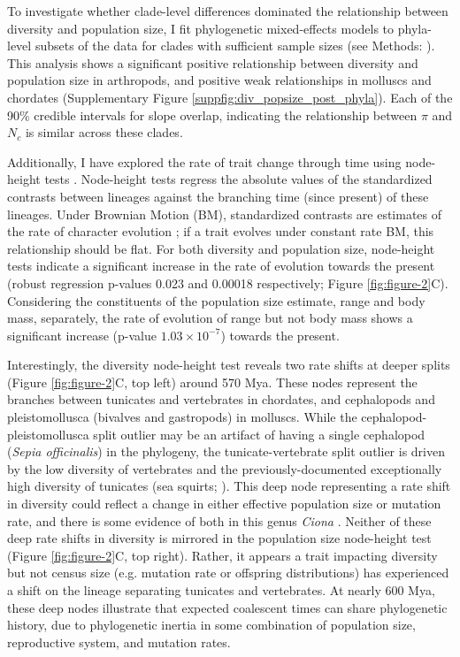 \documentclass[11pt]{article}
\newcommand{\Newnameref}[1]{\textit{\nameref{#1}}}
\begin{document}
To investigate whether clade-level differences dominated the relationship
between diversity and population size, I fit phylogenetic mixed-effects models
to phyla-level subsets of the data for clades with sufficient sample sizes (see
Methods: \Newnameref{sec:methods-pcm}). This analysis shows a significant
positive relationship between diversity and population size in arthropods, and
positive weak relationships in molluscs and chordates (Supplementary Figure
\ref{suppfig:div_popsize_post_phyla}). Each of the 90\% credible intervals for
slope overlap, indicating the relationship between $\pi$ and $N_c$ is similar
across these clades.

Additionally, I have explored the rate of trait change through time using
node-height tests \parencite{Freckleton2006-ww}. Node-height tests regress the
absolute values of the standardized contrasts between lineages against the
branching time (since present) of these lineages. Under Brownian Motion (BM),
standardized contrasts are estimates of the rate of character evolution
\parencite{Felsenstein1985-an}; if a trait evolves under constant rate BM, this
relationship should be flat. For both diversity and population size,
node-height tests indicate a significant increase in the rate of evolution
towards the present (robust regression p-values 0.023 and 0.00018 respectively;
Figure \ref{fig:figure-2}C). Considering the constituents of the population
size estimate, range and body mass, separately, the rate of evolution of range
but not body mass shows a significant increase (p-value $1.03 \times 10^{-7}$)
towards the present. 

Interestingly, the diversity node-height test reveals two rate shifts at deeper
splits (Figure \ref{fig:figure-2}C, top left) around 570 Mya. These nodes
represent the branches between tunicates and vertebrates in chordates, and
cephalopods and pleistomollusca (bivalves and gastropods) in molluscs.  While
the cephalopod-pleistomollusca split outlier may be an artifact of having a
single cephalopod (\emph{Sepia officinalis}) in the phylogeny, the
tunicate-vertebrate split outlier is driven by the low diversity of vertebrates
and the previously-documented exceptionally high diversity of tunicates (sea
squirts; \cite{Nydam2010-kg,Small2007-mt}). This deep node representing a rate
shift in diversity could reflect a change in either effective population size
or mutation rate, and there is some evidence of both in this genus \emph{Ciona}
\parencite{Small2007-mt,Tsagkogeorga2012-lv}. Neither of these deep rate shifts
in diversity is mirrored in the population size node-height test (Figure
\ref{fig:figure-2}C, top right). Rather, it appears a trait impacting diversity
but not census size (e.g. mutation rate or offspring distributions) has
experienced a shift on the lineage separating tunicates and vertebrates. At
nearly 600 Mya, these deep nodes illustrate that expected coalescent times can
share phylogenetic history, due to phylogenetic inertia in some combination of
population size, reproductive system, and mutation rates.
\end{document}

